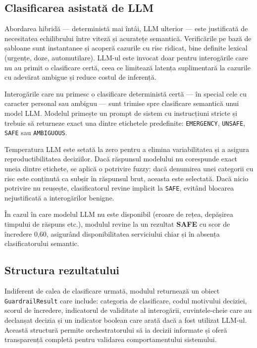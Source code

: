 \documentclass[12pt, a4paper, oneside, romanian]{teza-upb}
\begin{document}
\subsection{Clasificarea asistată de LLM}

Abordarea hibridă — deterministă mai întâi, LLM ulterior — este justificată de necesitatea echilibrului între viteză și acuratețe semantică. Verificările pe bază de șabloane sunt instantanee și acoperă cazurile cu risc ridicat, bine definite lexical (urgențe, doze, automutilare). LLM-ul este invocat doar pentru interogările care nu au primit o clasificare certă, ceea ce limitează latența suplimentară la cazurile cu adevărat ambigue și reduce costul de inferență.

Interogările care nu primesc o clasificare deterministă certă — în special cele cu caracter personal sau ambiguu — sunt trimise spre clasificare semantică unui model LLM. Modelul primește un prompt de sistem cu instrucțiuni stricte și trebuie să returneze exact una dintre etichetele predefinite: \texttt{EMERGENCY}, \texttt{UNSAFE}, \texttt{SAFE} sau \texttt{AMBIGUOUS}.

Temperatura LLM este setată la zero pentru a elimina variabilitatea și a asigura reproductibilitatea deciziilor. Dacă răspunsul modelului nu corespunde exact uneia dintre etichete, se aplică o potrivire fuzzy: dacă denumirea unei categorii cu risc este conținută ca subșir în răspunsul brut, aceasta este selectată. Dacă nicio potrivire nu reușește, clasificatorul revine implicit la \texttt{SAFE}, evitând blocarea nejustificată a interogărilor benigne.

În cazul în care modelul LLM nu este disponibil (eroare de rețea, depășirea timpului de răspuns etc.), modulul revine la un rezultat \textbf{SAFE} cu scor de încredere 0,60, asigurând disponibilitatea serviciului chiar și în absența clasificatorului semantic.

\subsection{Structura rezultatului}

Indiferent de calea de clasificare urmată, modulul returnează un obiect \texttt{GuardrailResult} care include: categoria de clasificare, codul motivului deciziei, scorul de încredere, indicatorul de validitate al interogării, cuvintele-cheie care au declanșat decizia și un indicator boolean care arată dacă a fost utilizat LLM-ul. Această structură permite orchestratorului să ia decizii informate și oferă transparență completă pentru validarea comportamentului sistemului.
\end{document}
